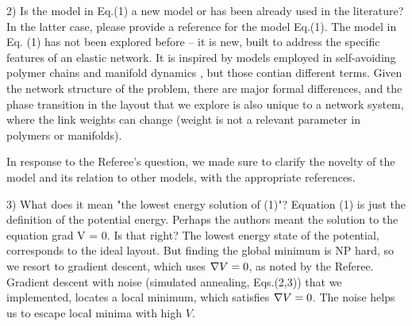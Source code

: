 \documentclass[11pt]{article}
\begin{document}
\begin{response}{
2) Is the model in Eq.(1) a new model or has been already used in the literature? In the latter case, please provide a reference for the model Eq.(1). 
}
The model in Eq. (1) has not been explored before -- it is new, built to address the specific features of an elastic network. 
It is inspired by models employed in self-avoiding polymer chains \cite{des1974lagrangian} and manifold dynamics \cite{mezard1991replica}, but those contian different terms. 
Given the network structure of the problem, there are major formal differences, and the phase transition in the layout that we explore is also unique to a network system, 
where the link weights can change (weight is not a relevant parameter in polymers or manifolds).

In response to the Referee's question, we made sure to clarify the novelty of the model and its relation to other models, with the appropriate references.
\end{response}
\begin{response}{
3) What does it mean "the lowest energy solution of (1)"? Equation (1) is just the definition of the potential energy. Perhaps the authors meant the solution to the equation grad V = 0. Is that right?
}
The lowest energy state of the potential, corresponds to the ideal layout. 
But finding the global minimum is NP hard, so we resort to gradient descent, which uses $\nabla V=0$, as noted by the Referee. %
Gradient descent with noise (simulated annealing, Eqs.(2,3)) that we implemented, locates a local minimum, which satisfies $\nabla V = 0$. 
The noise helps us to escape local minima with high $V$. %
\end{response}
\end{document}
